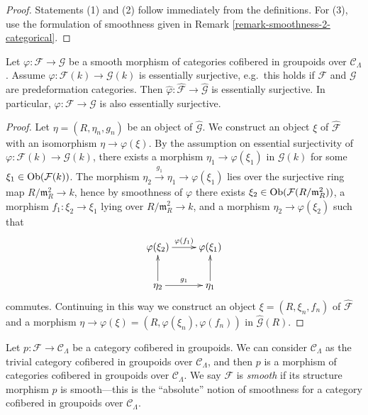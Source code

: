 \begin{proof}
Statements (1) and (2) follow immediately from the definitions.  For (3), use 
the formulation of smoothness given in Remark 
\ref{remark-smoothness-2-categorical}.
\end{proof}

\begin{lemma}
\label{lemma-smooth-morphism-essentially-surjective}
Let $\varphi: \mathcal F \rightarrow \mathcal G$ be a smooth morphism of 
categories cofibered in groupoids over $\mathcal C_{\Lambda}$.  Assume 
$\varphi: \mathcal F(k) \rightarrow \mathcal G(k)$ is essentially surjective, 
e.g.\ this holds if $\mathcal F$ and $\mathcal G$ are predeformation 
categories. Then $\widehat{\varphi}: \widehat{\mathcal F} \rightarrow 
\widehat{\mathcal G}$ is essentially surjective.  In particular, $\varphi: 
\mathcal F \rightarrow \mathcal G$ is also essentially surjective.
\end{lemma}

\begin{proof}
Let $\eta = (R,\eta_{n},g_n)$ be an object of $\widehat{\mathcal G}$.  We 
construct an object $\xi$ of $\widehat{\mathcal F}$ with an isomorphism $\eta 
\rightarrow \varphi(\xi)$. By the assumption on essential surjectivity of 
$\varphi: \mathcal F(k) \rightarrow \mathcal G(k)$, there exists a morphism 
$\eta_{1} \rightarrow \varphi(\xi_1)$ in $\mathcal G(k)$ for some $\xi_{1} \in 
\textnormal{Ob}(\mathcal F(k))$.  The morphism $\eta_{2} \xrightarrow{g_1} 
\eta_{1} \rightarrow  \varphi(\xi_1)$ lies over the surjective ring map 
$R/\mathfrak{m}_R^2 \rightarrow k$, hence by smoothness of $\varphi$ there 
exists $\xi_{2} \in \textnormal{Ob}(\mathcal F(R/\mathfrak{m}_R^2))$, a 
morphism $f_1: \xi_{2} \rightarrow \xi_{1}$ lying over $R/\mathfrak{m}_R^2 
\rightarrow k$, and a morphism $\eta_{2} \rightarrow \varphi(\xi_2)$ such that 
\[
\xymatrix{
\varphi(\xi_{2})  \ar[r]^{\varphi(f_1)} &  \varphi(\xi_{1})   \\
\eta_{2}   \ar[u] \ar[r]^{g_1}  & \eta_1  \ar[u] \\
}
\]
commutes.  Continuing in this way we construct an object $\xi = 
(R,\xi_{n},f_{n})$ of $\widehat{\mathcal F}$ and a morphism $\eta \rightarrow 
\varphi(\xi) = (R,\varphi(\xi_n),\varphi(f_{n}))$ in $\widehat{\mathcal G}(R)$.
\end{proof}

\begin{remark}
\label{remark-cofibered-groupoid-projection-smooth}
Let $p: \mathcal F \rightarrow \mathcal C_{\Lambda}$ be a category cofibered in 
groupoids. We can consider $\mathcal C_{\Lambda}$ as the trivial category 
cofibered in groupoids over $\mathcal C_{\Lambda}$, and then $p$ is a morphism 
of categories cofibered in groupoids over $\mathcal C_{\Lambda}$.  We say 
$\mathcal F$ is \emph{smooth} if its structure morphism $p$ is smooth---this is 
the ``absolute'' notion of smoothness for a category cofibered in groupoids 
over $\mathcal C_{\Lambda}$.
\end{remark}

